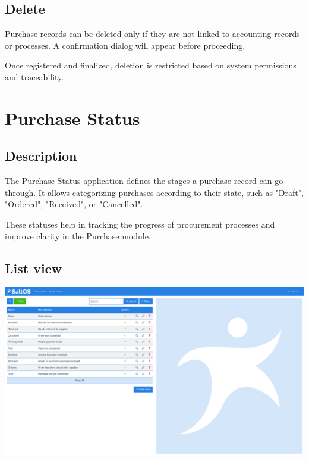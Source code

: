 \documentclass[a4paper]{article}
\begin{document}
\hypertarget{toc120}{}
\subsection{Delete}

Purchase records can be deleted only if they are not linked to accounting records or processes.
A confirmation dialog will appear before proceeding.

Once registered and finalized, deletion is restricted based on system permissions and traceability.


\hypertarget{toc121}{}
\section{Purchase Status}

\hypertarget{toc122}{}
\subsection{Description}

The Purchase Status application defines the stages a purchase record can go through.
It allows categorizing purchases according to their state, such as "Draft", "Ordered", "Received", or "Cancelled".

These statuses help in tracking the progress of procurement processes and improve clarity in the Purchase module.

\hypertarget{toc123}{}
\subsection{List view}

\begin{center}\includegraphics[width=1\textwidth]{../ujest/snaps/test-screenshots-js-screenshots-purchases-purchase-status-list-en-us-1-snap.png}\end{center}
\end{document}
